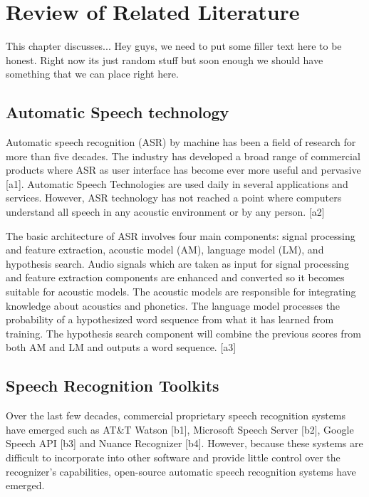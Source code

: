 
\chapter{Review of Related Literature}

This chapter discusses... Hey guys, we need to put some filler text here to be honest. Right now its just random stuff but soon enough we should have something that we can place right here.

\section{Automatic Speech technology}

Automatic speech recognition (ASR) by machine has been a field of research for more than five decades. The industry has developed a broad range of commercial products where ASR as user interface has become ever more useful and pervasive [a1]. Automatic Speech Technologies are used daily in several applications and services. However, ASR technology has not reached a point where computers understand all speech in any acoustic environment or by any person. [a2]

The basic architecture of ASR involves four main components: signal processing and feature extraction, acoustic model (AM), language model (LM), and hypothesis search. Audio signals which are taken as input for signal processing and feature extraction components are enhanced and converted so it becomes suitable for acoustic models. The acoustic models are responsible for integrating knowledge about acoustics and phonetics. The language model processes the probability of a hypothesized word sequence from what it has learned from training. The hypothesis search component will combine the previous scores from both AM and LM and outputs a word sequence. [a3]

\section{Speech Recognition Toolkits}

Over the last few decades, commercial proprietary speech recognition systems have emerged such as AT\&T Watson [b1], Microsoft Speech Server [b2], Google Speech API [b3] and Nuance Recognizer [b4]. However, because these systems are difficult to incorporate into other software and provide little control over the recognizer's capabilities, open-source automatic speech recognition systems have emerged.

